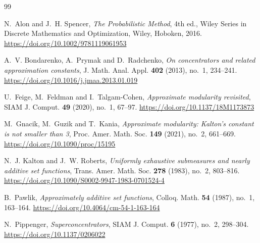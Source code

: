 \documentclass[11pt,a4paper]{amsart}
\begin{document}
\begin{thebibliography}{99}

N.~Alon and J.~H. Spencer,
\emph{The Probabilistic Method}, 4th ed.,
Wiley Series in Discrete Mathematics and Optimization, Wiley, Hoboken, 2016.
\url{https://doi.org/10.1002/9781119061953}

A.~V. Bondarenko, A.~Prymak and D.~Radchenko,
\emph{On concentrators and related approximation constants},
J. Math. Anal. Appl. \textbf{402} (2013), no.~1, 234--241.
\url{https://doi.org/10.1016/j.jmaa.2013.01.019}

U.~Feige, M.~Feldman and I.~Talgam-Cohen,
\emph{Approximate modularity revisited},
SIAM J. Comput. \textbf{49} (2020), no.~1, 67--97.
\url{https://doi.org/10.1137/18M1173873}

M.~Gnacik, M.~Guzik and T.~Kania,
\emph{Approximate modularity: Kalton's constant is not smaller than 3},
Proc. Amer. Math. Soc. \textbf{149} (2021), no.~2, 661--669.
\url{https://doi.org/10.1090/proc/15195}

N.~J. Kalton and J.~W. Roberts,
\emph{Uniformly exhaustive submeasures and nearly additive set functions},
Trans. Amer. Math. Soc. \textbf{278} (1983), no.~2, 803--816.
\url{https://doi.org/10.1090/S0002-9947-1983-0701524-4}

B.~Pawlik,
\emph{Approximately additive set functions},
Colloq. Math. \textbf{54} (1987), no.~1, 163--164.
\url{https://doi.org/10.4064/cm-54-1-163-164}

N.~Pippenger,
\emph{Superconcentrators},
SIAM J. Comput. \textbf{6} (1977), no.~2, 298--304.
\url{https://doi.org/10.1137/0206022}

\end{thebibliography}
\end{document}
